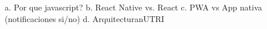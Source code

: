 a. Por que javascript?
   b. React Native vs. React
   c. PWA vs App nativa (notificaciones si/no)
   d. ArquitecturanUTRI